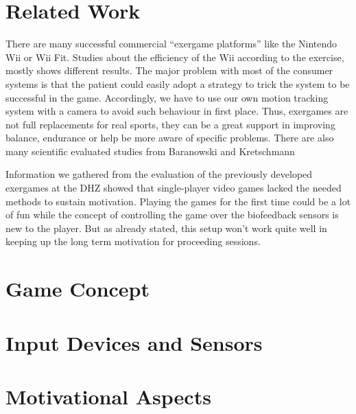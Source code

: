 \begin{multicols}{2}
\section{Related Work}
There are many successful commercial “exergame platforms” like the Nintendo Wii or Wii Fit. Studies about the efficiency of the Wii according to the exercise, mostly shows different results. \cite{Baranowski2012} The major problem with most of the consumer systems is that the patient could easily adopt a strategy to trick the system to be successful in the game. Accordingly, we have to use our own motion tracking system with a camera to avoid such behaviour in first place. Thus, exergames are not full replacements for real sports, they can be a great support in improving balance, endurance or help be more aware of specific problems. There are also many scientific evaluated studies from Baranowski \cite{Baranowski2008} and Kretschmann %

Information we gathered from the evaluation of the previously developed exergames at the DHZ showed that single-player video games lacked the needed methods to sustain motivation. Playing the games for the first time could be a lot of fun while the concept of controlling the game over the biofeedback sensors is new to the player. But as already stated, this setup won't work quite well in keeping up the long term motivation for proceeding sessions.

\section{Game Concept}


\section{Input Devices and Sensors}


\section{Motivational Aspects}


\end{multicols}

